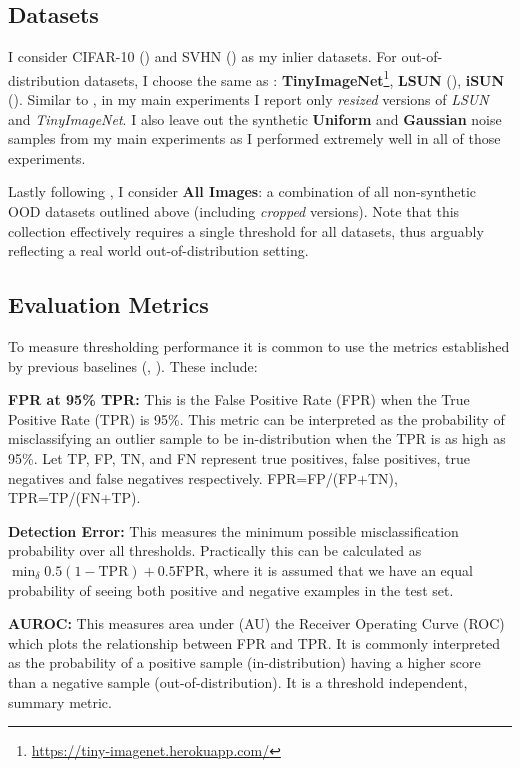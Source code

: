 \subsection*{Datasets}
\label{datasets}
I consider CIFAR-10 (\cite{Krizhevsky2009learning}) and SVHN (\cite{Netzer2011reading}) as my inlier datasets. For out-of-distribution datasets, I choose the same as \cite{Liang2017}: \textbf{TinyImageNet}\footnote{\url{https://tiny-imagenet.herokuapp.com/}}, \textbf{LSUN} (\cite{Yu2015lsun}), \textbf{iSUN} (\cite{Xu2015turkergaze}). Similar to \cite{Devries}, in my main experiments I report only \textit{resized} versions of \textit{LSUN} and \textit{TinyImageNet}. I also leave out the synthetic \textbf{Uniform} and \textbf{Gaussian} noise samples from my main experiments as I performed extremely well in all of those experiments.

Lastly following \cite{Devries}, I consider \textbf{All Images}: a combination of all non-synthetic OOD datasets outlined above (including \textit{cropped} versions). Note that this collection effectively requires a single threshold for all datasets, thus arguably reflecting a real world out-of-distribution setting.

\subsection*{Evaluation Metrics}

To measure thresholding performance it is common to use the metrics established by previous baselines (\cite{Hendrycks2019}, \cite{Liang2017}). These include:

\textbf{FPR at 95\% TPR:} This is the False Positive Rate (FPR) when the True Positive Rate (TPR) is 95\%. This metric can be interpreted as the probability of misclassifying an outlier sample to be in-distribution when the TPR is as high as 95\%. Let TP, FP, TN, and FN represent true positives, false positives, true negatives and false negatives respectively. FPR=FP/(FP+TN), TPR=TP/(FN+TP).

\textbf{Detection Error:} This measures the minimum possible misclassification probability over all thresholds. Practically this can be calculated as $\min_{\delta} 0.5(1-\text{TPR}) + 0.5\text{FPR}$, where it is assumed that we have an equal probability of seeing both positive and negative examples in the test set.

\textbf{AUROC:} This measures area under (AU) the Receiver Operating Curve (ROC) which plots the relationship between FPR and TPR. It is commonly interpreted as the probability of a positive sample (in-distribution) having a higher score than a negative sample (out-of-distribution). It is a threshold independent, summary metric.

